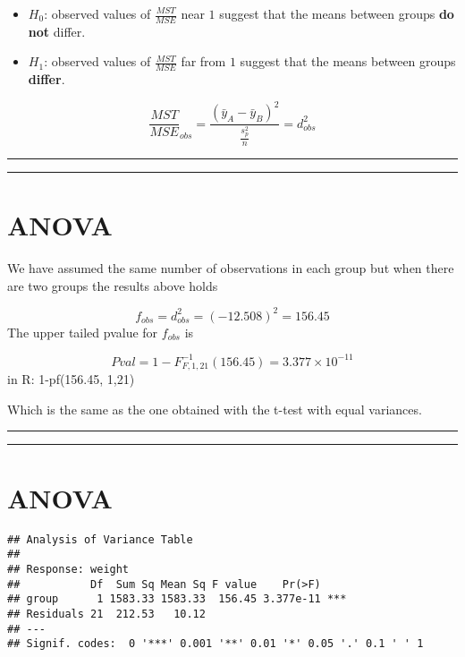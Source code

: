 \documentclass[
]{book}
\begin{document}
\begin{itemize}
\item
  \(H_0\): observed values of \(\frac{MST}{MSE}\) near \(1\) suggest that the means between groups \textbf{do not} differ.
\item
  \(H_1\): observed values of \(\frac{MST}{MSE}\) far from \(1\) suggest that the means between groups \textbf{differ}.
\end{itemize}

\[\frac{MST}{MSE}_{obs}=\frac{(\bar{y}_{A}-\bar{y}_{B})^2}{\frac{s^2_p}{n}}=d_{obs}^2\]

\begin{center}\rule{0.5\linewidth}{0.5pt}\end{center}

\begin{center}\rule{0.5\linewidth}{0.5pt}\end{center}

\hypertarget{anova-1}{%
\section{ANOVA}\label{anova-1}}

We have assumed the same number of observations in each group but when there are two groups the results above holds

\[f_{obs}=d_{obs}^2=(−12.508)^2=156.45\]
The upper tailed pvalue for \(f_{obs}\) is

\[Pval=1-F^{-1}_{F,1,21}(156.45)=3.377 \times 10^{-11}\]
in R: 1-pf(156.45, 1,21)

Which is the same as the one obtained with the t-test with equal variances.

\begin{center}\rule{0.5\linewidth}{0.5pt}\end{center}

\begin{center}\rule{0.5\linewidth}{0.5pt}\end{center}

\hypertarget{anova-2}{%
\section{ANOVA}\label{anova-2}}

\begin{verbatim}
## Analysis of Variance Table
## 
## Response: weight
##           Df  Sum Sq Mean Sq F value    Pr(>F)    
## group      1 1583.33 1583.33  156.45 3.377e-11 ***
## Residuals 21  212.53   10.12                      
## ---
## Signif. codes:  0 '***' 0.001 '**' 0.01 '*' 0.05 '.' 0.1 ' ' 1
\end{verbatim}
\end{document}
